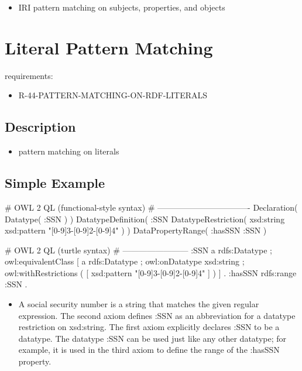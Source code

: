 \documentclass{llncs}
\begin{document}
\begin{itemize}
	\item IRI pattern matching on subjects, properties, and objects
\end{itemize}

\section{Literal Pattern Matching}

requirements:

\begin{itemize}
  \item R-44-PATTERN-MATCHING-ON-RDF-LITERALS
\end{itemize}

\subsection{Description}

\begin{itemize}
	\item pattern matching on literals
\end{itemize}

\subsection{Simple Example}

\begin{ex}
# OWL 2 QL (functional-style syntax)
# ----------------------------------
Declaration( Datatype( :SSN ) ) 
DatatypeDefinition( 
    :SSN
    DatatypeRestriction( xsd:string xsd:pattern "[0-9]{3}-[0-9]{2}-[0-9]{4}" ) )     
DataPropertyRange( :hasSSN :SSN ) 
\end{ex}

\begin{ex}
# OWL 2 QL (turtle syntax)
# ------------------------
:SSN 
    a rdfs:Datatype ;
    owl:equivalentClass [
        a rdfs:Datatype ;
        owl:onDatatype xsd:string ;
        owl:withRestrictions ( 
            [ xsd:pattern "[0-9]{3}-[0-9]{2}-[0-9]{4}" ] ) ] .
:hasSSN rdfs:range :SSN .
\end{ex}

\begin{itemize}
	\item A social security number is a string that matches the given regular expression. 
The second axiom defines :SSN as an abbreviation for a datatype restriction on xsd:string. 
The first axiom explicitly declares :SSN to be a datatype. 
The datatype :SSN can be used just like any other datatype; 
for example, it is used in the third axiom to define the range of the :hasSSN property. 
\end{itemize}
\end{document}
